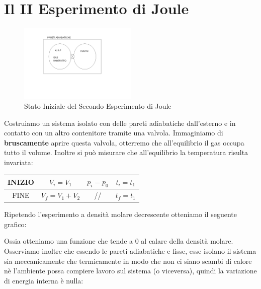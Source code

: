 \documentclass{article}
\begin{document}
\section{Il II Esperimento di Joule}
\begin{figure}[H]
    \centering
    \includegraphics[width=0.5\textwidth]{SecondoJoule.png}
    \caption{Stato Iniziale del Secondo Esperimento di Joule}
    \label{SecondoJoule}
\end{figure}
Costruiamo un sistema isolato con delle pareti adiabatiche dall'esterno e in contatto con un altro contenitore tramite una valvola. Immaginiamo di \textbf{bruscamente} aprire questa valvola, otterremo che all'equilibrio il gas occupa tutto il volume. Inoltre si può misurare che all'equilibrio la temperatura risulta invariata:\\
\begin{center}
\begin{tabular}{c|c|c|c}
    INIZIO & $V_i=V_1$ & $p_i=p_0$ & $t_i=t_1$ \\
    \hline
    FINE & $V_f=V_1+V_2$ & // & $t_f=t_1$
\end{tabular} 
\end{center}
Ripetendo l'esperimento a densità molare decrescente otteniamo il seguente grafico:\\
\begin{center}
\end{center}
Ossia otteniamo una funzione che tende a 0 al calare della densità molare. Osserviamo inoltre che essendo le pareti adiabatiche e fisse, esse isolano il sistema sia meccanicamente che termicamente in modo che non ci siano scambi di calore nè l'ambiente possa compiere lavoro sul sistema (o viceversa), quindi la variazione di energia interna è nulla:
\end{document}
